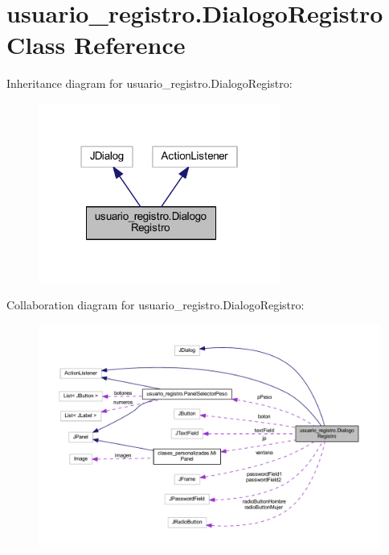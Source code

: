 \hypertarget{classusuario__registro_1_1_dialogo_registro}{}\section{usuario\+\_\+registro.\+Dialogo\+Registro Class Reference}
\label{classusuario__registro_1_1_dialogo_registro}


Inheritance diagram for usuario\+\_\+registro.\+Dialogo\+Registro\+:
\nopagebreak
\begin{figure}[H]
\begin{center}
\leavevmode
\includegraphics[width=226pt]{classusuario__registro_1_1_dialogo_registro__inherit__graph}
\end{center}
\end{figure}


Collaboration diagram for usuario\+\_\+registro.\+Dialogo\+Registro\+:
\nopagebreak
\begin{figure}[H]
\begin{center}
\leavevmode
\includegraphics[width=350pt]{classusuario__registro_1_1_dialogo_registro__coll__graph}
\end{center}
\end{figure}
